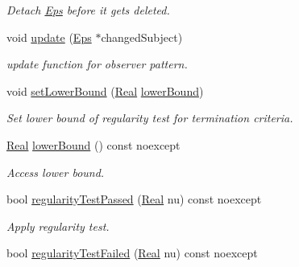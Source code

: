 \begin{DoxyCompactItemize}
\begin{DoxyCompactList}\small\item\em Detach \hyperlink{classSpacy_1_1Mixin_1_1Eps}{Eps} before it gets deleted. \end{DoxyCompactList}\item 
\hypertarget{classSpacy_1_1Mixin_1_1Eps_a151216968daef3da5f5cdc0b957ce01b}{}void \hyperlink{classSpacy_1_1Mixin_1_1Eps_a151216968daef3da5f5cdc0b957ce01b}{update} (\hyperlink{classSpacy_1_1Mixin_1_1Eps_a51dbe0b9cc950e0f3dfd34a481f08ae4_a51dbe0b9cc950e0f3dfd34a481f08ae4}{Eps} $\ast$changed\+Subject)\label{classSpacy_1_1Mixin_1_1Eps_a151216968daef3da5f5cdc0b957ce01b}

\begin{DoxyCompactList}\small\item\em update function for observer pattern. \end{DoxyCompactList}\item 
void \hyperlink{classSpacy_1_1Mixin_1_1RegularityTest_a051394f2ffb0abd9a26ab7a64c590eee_a051394f2ffb0abd9a26ab7a64c590eee}{set\+Lower\+Bound} (\hyperlink{classSpacy_1_1Real}{Real} \hyperlink{classSpacy_1_1Mixin_1_1RegularityTest_a8a807e4449e6b6b64e7e81834d331597_a8a807e4449e6b6b64e7e81834d331597}{lower\+Bound})
\begin{DoxyCompactList}\small\item\em Set lower bound of regularity test for termination criteria. \end{DoxyCompactList}\item 
\hyperlink{classSpacy_1_1Real}{Real} \hyperlink{classSpacy_1_1Mixin_1_1RegularityTest_a8a807e4449e6b6b64e7e81834d331597_a8a807e4449e6b6b64e7e81834d331597}{lower\+Bound} () const noexcept
\begin{DoxyCompactList}\small\item\em Access lower bound. \end{DoxyCompactList}\item 
bool \hyperlink{classSpacy_1_1Mixin_1_1RegularityTest_afe2fd3259850b874a85779d4f562e7f6_afe2fd3259850b874a85779d4f562e7f6}{regularity\+Test\+Passed} (\hyperlink{classSpacy_1_1Real}{Real} nu) const noexcept
\begin{DoxyCompactList}\small\item\em Apply regularity test. \end{DoxyCompactList}\item 
bool \hyperlink{classSpacy_1_1Mixin_1_1RegularityTest_a26217e26765bb6f938224ea76612c8c0_a26217e26765bb6f938224ea76612c8c0}{regularity\+Test\+Failed} (\hyperlink{classSpacy_1_1Real}{Real} nu) const noexcept

\end{DoxyCompactItemize}
